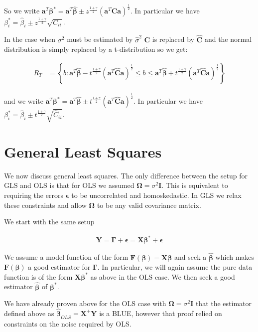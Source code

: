 \documentclass[12pt]{article}
\newcommand{\ep}{\epsilon}
\newcommand{\bv}[1]{\boldsymbol{#1}}
\begin{document}
So we write $\bv{a}^T\bv{\beta^*} = \bv{a}^T\bv{\hat{\beta}} \pm z^{\frac{1+\gamma}{2}}(\bv{a}^T\bv{C}\bv{a})^{\frac{1}{2}}$. 
In particular we have $\beta^*_i = \hat{\beta}_i \pm z^{\frac{1+\gamma}{2}}\sqrt{C_{ii}}$.

In the case when $\sigma^2$ must be estimated by $\hat{\sigma}^2$ $\bv{C}$ is replaced by $\bv{\hat{C}}$ and the normal distribution is simply replaced by a t-distribution so we get:

\begin{align}
R_T &= \left\{b: \bv{a}^T\bv{\hat{\beta}} - t^{\frac{1+\gamma}{2}}(\bv{a}^T\bv{\hat{C}}\bv{a})^{\frac{1}{2}} \le b \le \bv{a}^T\bv{\hat{\beta}} + t^{\frac{1+\gamma}{2}}(\bv{a}^T\bv{\hat{C}}\bv{a})^{\frac{1}{2}} \right\}
\end{align}

and we write $\bv{a}^T\bv{\beta^*} = \bv{a}^T\bv{\hat{\beta}} \pm t^{\frac{1+\gamma}{2}}(\bv{a}^T\bv{\hat{C}}\bv{a})^{\frac{1}{2}}$. 
In particular we have $\beta^*_i = \hat{\beta}_i \pm t^{\frac{1+\gamma}{2}}\sqrt{\hat{C}_{ii}}$.

\section{General Least Squares}

We now discuss general least squares. 
The only difference between the setup for GLS and OLS is that for OLS we assumed $\bv{\Omega} = \sigma^2 \bv{I}$. 
This is equivalent to requiring the errors $\bv{\ep}$ to be uncorrelated and homoskedastic. 
In GLS we relax these constraints and allow $\bv{\Omega}$ to be any valid covariance matrix.

We start with the same setup

\begin{align}
\bv{Y} = \bv{\Gamma} + \bv{\ep} = \bv{X}\bv{\beta^*} + \bv{\ep}
\end{align}

We assume a model function of the form $\bv{F}(\bv{\beta}) = \bv{X}\bv{\beta}$ and seek a $\bv{\hat{\beta}}$ which makes $\bv{F}(\bv{\beta})$ a good estimator for $\bv{\Gamma}$. 
In particular, we will again assume the pure data function is of the form $\bv{X}\bv{\beta^*}$ as above in the OLS case. 
We then seek a good estimator $\bv{\hat{\beta}}$ of $\bv{\beta^*}$.

We have already proven above for the OLS case with $\bv{\Omega} = \sigma^2\bv{I}$ that the estimator defined above as $\bv{\hat{\beta}}_{OLS} = \bv{X}^+\bv{Y}$ is a BLUE, however that proof relied on constraints on the noise required by OLS.
\end{document}
